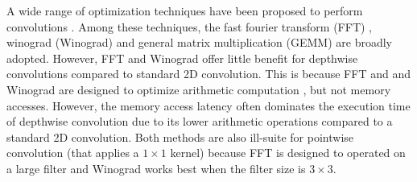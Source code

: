 A wide range of optimization techniques have been proposed to perform convolutions
\cite{Zhen2018Optimizing,liu2019optimizing,winter2019adaptive,li2019autofft,yan2020optimizing,Vasudevan2017Parallel,li2019coordinated,wu2020ugemm}.
Among these techniques, the fast fourier transform (FFT) \cite{li2019autofft}, winograd (Winograd) \cite{yan2020optimizing} and general
matrix multiplication (GEMM) \cite{Vasudevan2017Parallel,li2019coordinated,wu2020ugemm} are broadly adopted. However, FFT and Winograd offer little
benefit for depthwise convolutions compared to standard 2D convolution. This is because FFT and and Winograd are designed to optimize
arithmetic computation \cite{zlateski2019anatomy,yan2020optimizing}, but not memory accesses. However, the memory access latency often dominates the execution time of
depthwise convolution \cite{cudaperformance} due to its lower arithmetic operations compared to a standard 2D convolution.  Both methods
are also ill-suite for pointwise convolution (that applies a $1 \times 1$ kernel) because FFT is designed to operated on a large filter and
Winograd works best when the filter size is $3 \times 3$.



